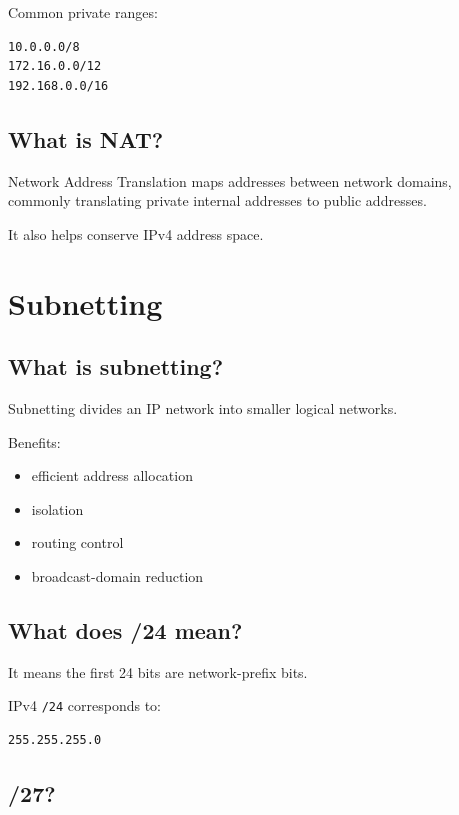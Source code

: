 Common private ranges:

\begin{lstlisting}
10.0.0.0/8
172.16.0.0/12
192.168.0.0/16
\end{lstlisting}

\medskip

\subsection{What is NAT?}

Network Address Translation maps addresses between network domains, commonly translating private internal addresses to public addresses.

It also helps conserve IPv4 address space.

\medskip

\section{Subnetting}

\subsection{What is subnetting?}

Subnetting divides an IP network into smaller logical networks.

Benefits:

\begin{itemize}
  \item efficient address allocation
  \item isolation
  \item routing control
  \item broadcast-domain reduction
\end{itemize}

\medskip

\subsection{What does /24 mean?}

It means the first 24 bits are network-prefix bits.

IPv4 \texttt{/24} corresponds to:

\begin{lstlisting}
255.255.255.0
\end{lstlisting}

\medskip

\subsection{/27?}

